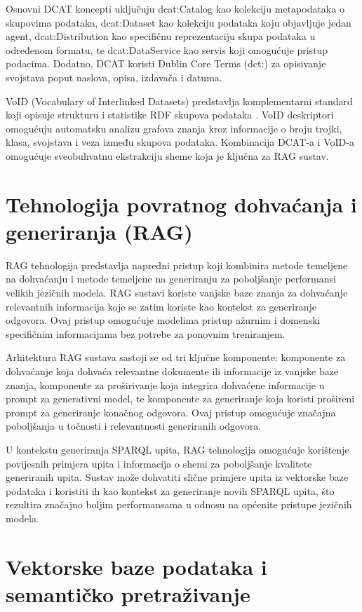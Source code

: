 Osnovni DCAT koncepti uključuju dcat:Catalog kao kolekciju metapodataka o skupovima podataka, dcat:Dataset kao kolekciju podataka koju objavljuje jedan agent, dcat:Distribution kao specifičnu reprezentaciju skupa podataka u određenom formatu, te dcat:DataService kao servis koji omogućuje pristup podacima. Dodatno, DCAT koristi Dublin Core Terms (dct:) za opisivanje svojstava poput naslova, opisa, izdavača i datuma.

VoID (Vocabulary of Interlinked Datasets) predstavlja komplementarni standard koji opisuje strukturu i statistike RDF skupova podataka \cite{bizer2009linked}. VoID deskriptori omogućuju automatsku analizu grafova znanja kroz informacije o broju trojki, klasa, svojstava i veza između skupova podataka. Kombinacija DCAT-a i VoID-a omogućuje sveobuhvatnu ekstrakciju sheme koja je ključna za RAG sustav.

\section{Tehnologija povratnog dohvaćanja i generiranja (RAG)}
\label{sec:rag}

RAG tehnologija predstavlja napredni pristup koji kombinira metode temeljene na dohvaćanju i metode temeljene na generiranju za poboljšanje performansi velikih jezičnih modela. RAG sustavi koriste vanjske baze znanja za dohvaćanje relevantnih informacija koje se zatim koriste kao kontekst za generiranje odgovora. Ovaj pristup omogućuje modelima pristup ažurnim i domenski specifičnim informacijama bez potrebe za ponovnim treniranjem.

Arhitektura RAG sustava sastoji se od tri ključne komponente: komponente za dohvaćanje koja dohvaća relevantne dokumente ili informacije iz vanjske baze znanja, komponente za proširivanje koja integrira dohvaćene informacije u prompt za generativni model, te komponente za generiranje koja koristi prošireni prompt za generiranje konačnog odgovora. Ovaj pristup omogućuje značajna poboljšanja u točnosti i relevantnosti generiranih odgovora.

U kontekstu generiranja SPARQL upita, RAG tehnologija omogućuje korištenje povijesnih primjera upita i informacija o shemi za poboljšanje kvalitete generiranih upita. Sustav može dohvatiti slične primjere upita iz vektorske baze podataka i koristiti ih kao kontekst za generiranje novih SPARQL upita, što rezultira značajno boljim performansama u odnosu na općenite pristupe jezičnih modela.

\section{Vektorske baze podataka i semantičko pretraživanje}
\label{sec:vector_databases}

